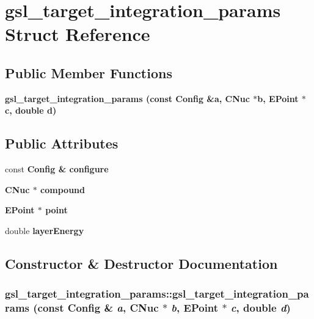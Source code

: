 \section{gsl\_\-target\_\-integration\_\-params Struct Reference}
\label{structgsl__target__integration__params}
\subsection*{Public Member Functions}
\begin{CompactItemize}
\item 
\bf{gsl\_\-target\_\-integration\_\-params} (const \bf{Config} \&a, \bf{CNuc} $\ast$b, \bf{EPoint} $\ast$c, double d)
\end{CompactItemize}
\subsection*{Public Attributes}
\begin{CompactItemize}
\item 
const \bf{Config} \& \bf{configure}
\item 
\bf{CNuc} $\ast$ \bf{compound}
\item 
\bf{EPoint} $\ast$ \bf{point}
\item 
double \bf{layer\-Energy}
\end{CompactItemize}


\subsection{Constructor \& Destructor Documentation}
\subsubsection{\setlength{\rightskip}{0pt plus 5cm}gsl\_\-target\_\-integration\_\-params::gsl\_\-target\_\-integration\_\-params (const \bf{Config} \& {\em a}, \bf{CNuc} $\ast$ {\em b}, \bf{EPoint} $\ast$ {\em c}, double {\em d})\hspace{0.3cm}{\tt  [inline]}}\label{structgsl__target__integration__params_cb8c75bd733d72ea98640cb72ea65164}




